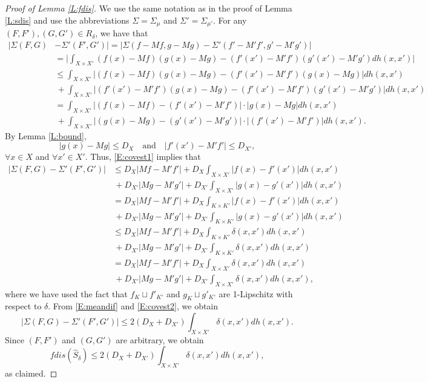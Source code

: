 \documentclass[11pt]{article}
\theoremstyle{definition}
\begin{document}
\begin{proof}[Proof of Lemma \ref{L:fdis}]
We use the same notation as in the proof of Lemma \ref{L:sdis} and use the abbreviations $\Sigma=\Sigma_\mu$ and $\Sigma' = \Sigma_{\mu'}$. For any $(F,F'), (G,G') \in R_\delta$, we have that
\begin{equation} \label{E:covest1}
\begin{split}
|\Sigma(F,G) &- \Sigma'(F',G')| =
|\Sigma (f-Mf,g-Mg)-\Sigma' (f'-M'f',g'-M'g')| \\
&=\Big| \int_{X\times X'} (f(x)-Mf)(g(x)-Mg) - 
(f'(x')-M'f')(g'(x')-M'g') dh(x,x')\Big| \\
&\leq \int_{X\times X'} \big|(f(x)-Mf)(g(x)-Mg) - 
(f'(x')-M'f')(g(x)-Mg) \big| dh (x,x') \\
&\,+ \int_{X\times X'} \big|(f'(x')-M'f')(g(x)-Mg)
- (f'(x')-M'f')(g'(x')-M'g') \big| dh (x,x') \\
&= \int_{X\times X'} \big|(f(x)-Mf) - 
(f'(x')-M'f')\big| \cdot \big|g(x)-Mg\big| dh (x,x') \\
&\,+ \int_{X\times X'} \big|(g(x)-Mg) 
- (g'(x')-M'g')\big| \cdot \big| (f'(x')-M'f') \big| dh (x,x').
\end{split}
\end{equation}
By Lemma \ref{L:bound}, 
\begin{equation}
|g(x)-Mg|\leq D_X \quad \text{and} \quad |f'(x')-M'f'|\leq D_{X'}, 
\end{equation}
$\forall x\in X$ and $\forall x'\in X'$. Thus, \eqref{E:covest1} implies that
\begin{equation} \label{E:covest2}
\begin{split}
|\Sigma(F,G)-\Sigma'(F',G')| &\leq D_X |Mf-M'f'| + 
D_X \int_{X\times X'} |f(x)- f'(x')|dh (x,x') \\
&\,+ D_{X'} |Mg-M'g'| + 
D_{X'} \int_{X\times X'} |g(x)-g'(x')|dh (x,x') \\
&= D_X |Mf-M'f'| + 
D_X \int_{K\times K'} |f(x)- f'(x')|dh (x,x') \\
&\,+ D_{X'} |Mg-M'g'| + 
D_{X'} \int_{K\times K'} |g(x)-g'(x')|dh (x,x') \\
&\leq D_X |Mf-M'f'| + 
D_X \int_{K\times K'} \delta(x,x') dh (x,x') \\
&\,+ D_{X'} |Mg-M'g'| + 
D_{X'} \int_{K\times K'} \delta(x,x') dh (x,x') \\
&= D_X |Mf-M'f'| + 
D_X \int_{X\times X'} \delta(x,x') dh (x,x') \\
&\,+ D_{X'} |Mg-M'g'| + 
D_{X'} \int_{X\times X'} \delta(x,x') dh (x,x'),
\end{split}
\end{equation}
where we have used the fact that $f_K \sqcup f'_{K'}$ and $g_K\sqcup g'_{K'}$ are 1-Lipschitz with respect to $\delta$. From \eqref{E:meandif} and \eqref{E:covest2}, we obtain
\begin{equation}
|\Sigma(F,G)-\Sigma'(F',G')| \leq 2 (D_X + D_{X'}) 
\int_{X\times X'} \delta(x,x') dh (x,x').
\end{equation}
Since $(F,F')$ and $(G,G')$ are arbitrary, we obtain
\begin{equation}
fdis(\hat{S}_\delta) \leq 2 (D_X + D_{X'}) 
\int_{X\times X'} \delta(x,x') dh (x,x'),
\end{equation}
as claimed.
\end{proof}
\end{document}
